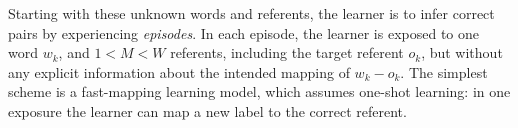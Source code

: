 \documentclass[a4paper,natbib,man]{apa6}
\begin{document}
Starting with these unknown words and referents, the learner is to infer correct pairs by experiencing {\it episodes}.
In each episode, the learner is exposed to one word $w_{k}$, and $1 < M < W$ referents, including the target referent $o_{k}$, but without any explicit information about the intended mapping of $w_{k}-o_{k}$. 
The simplest scheme is a fast-mapping learning model, which assumes one-shot learning: in one exposure the learner can map a new label to the correct referent. 
\end{document}
